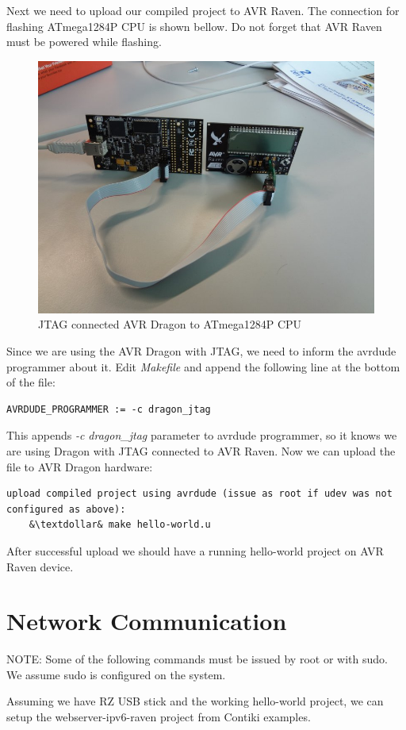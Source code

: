 \documentclass{article}
\begin{document}
Next we need to upload our compiled project to AVR Raven.
The connection for flashing ATmega1284P CPU is shown bellow.
Do not forget that AVR Raven must be powered while flashing.
\begin{figure}[H]
  \centering
  \includegraphics[width=12cm,keepaspectratio]{smallfig/DSC02184-small.jpeg}
  \caption{JTAG connected AVR Dragon to ATmega1284P CPU}
\end{figure}
Since we are using the AVR Dragon with JTAG, we need to inform the avrdude programmer about it.
Edit {\it{Makefile}} and append the following line at the bottom of the file:
\begin{lstlisting}
AVRDUDE_PROGRAMMER := -c dragon_jtag
\end{lstlisting}

This appends {\it{-c dragon\_jtag}} parameter to avrdude programmer, so it knows we are using Dragon with JTAG connected to AVR Raven.
Now we can upload the file to AVR Dragon hardware:
\begin{lstlisting}
upload compiled project using avrdude (issue as root if udev was not configured as above):
	&\textdollar& make hello-world.u
\end{lstlisting}
After successful upload we should have a running hello-world project on AVR Raven device.


\section{Network Communication}
NOTE: Some of the following commands must be issued by root or with sudo. We assume sudo is configured on the system.

Assuming we have RZ USB stick and the working hello-world project,
we can setup the webserver-ipv6-raven project from Contiki examples.
\end{document}
